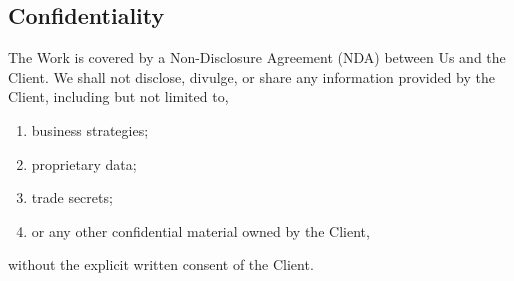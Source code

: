 \documentclass{article}
\begin{document}
\subsection{Confidentiality}
The Work is covered by a Non-Disclosure Agreement (NDA) between Us and the Client. We shall not disclose, divulge, or share any information provided by the Client, including but not limited to,
\begin{enumerate}
    \item business strategies;
    \item proprietary data;
    \item trade secrets;
    \item or any other confidential material owned by the Client,
\end{enumerate}
without the explicit written consent of the Client.
\end{document}
